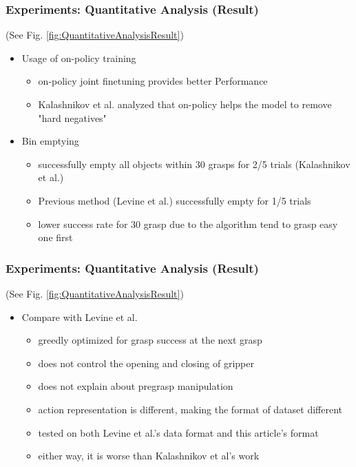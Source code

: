 \documentclass{beamer}
\newcommand{\sixthSec}{Experiments}
\begin{document}
    \begin{frame}
      \frametitle{\sixthSec: Quantitative Analysis (Result)}
      (See Fig. \ref{fig:QuantitativeAnalysisResult})
      \begin{itemize}
        \item Usage of on-policy training
        \begin{itemize}
          \item on-policy joint finetuning provides better Performance
          \item Kalashnikov et al. analyzed that on-policy helps the model to remove "hard negatives"
        \end{itemize}
        \pause
        \item Bin emptying
        \begin{itemize}
          \item successfully empty all objects within 30 grasps for 2/5 trials (Kalashnikov et al.)
          \item Previous method (Levine et al.) successfully empty for 1/5 trials
          \item lower success rate for 30 grasp due to the algorithm tend to grasp easy one first
        \end{itemize}
      \end{itemize}
    \end{frame}

    \begin{frame}
      \frametitle{\sixthSec: Quantitative Analysis (Result)}
      (See Fig. \ref{fig:QuantitativeAnalysisResult})
      \begin{itemize}
        \item Compare with Levine et al.
        \begin{itemize}
          \item greedly optimized for grasp success at the next grasp
          \item does not control the opening and closing of gripper
          \item does not explain about pregrasp manipulation
          \pause
          \item action representation is different, making the format of dataset different
          \pause
          \item tested on both Levine et al.'s data format and this article's format
          \item either way, it is worse than Kalashnikov et al's work
        \end{itemize}
      \end{itemize}
    \end{frame}
\end{document}

